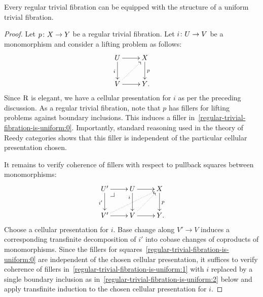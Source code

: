 \documentclass[reqno,10pt,a4paper,oneside,draft]{amsart}
\begin{document}
\begin{proposition} \label{regular-trivial-fibration-to-uniform}
Every regular trivial fibration can be equipped with the structure of a uniform trivial fibration.
\end{proposition}

\begin{proof} Let $p \colon X \to Y$ be a regular trivial fibration.
Let $i \colon U \to V$ be a monomorphism and consider a lifting problem as follows:
\begin{equation} \label{regular-trivial-fibration-is-uniform:0}
\xycenter{
  U
  \ar[d]_{i}
  \ar[r]
&
  X
  \ar[d]^{p}
\\
  V
  \ar[r]
  \ar@{.>}[ur]
&
  Y
\rlap{.}}
\end{equation}
Since $\mathrm{R}$ is elegant, we have a cellular presentation for $i$ as per the preceding discussion.
As a regular trivial fibration, note that $p$ has fillers for lifting problems against boundary inclusions.
This induces a filler in~\eqref{regular-trivial-fibration-is-uniform:0}.
Importantly, standard reasoning used in the theory of Reedy categories shows that this filler is independent of the particular cellular presentation chosen.

It remains to verify coherence of fillers with respect to pullback squares between monomorphisms:
\begin{equation} \label{regular-trivial-fibration-is-uniform:1}
\xycenter{
  U'
  \ar[d]_{i'}
  \ar[r]
  \pullback{dr}
&
  U
  \ar[d]_(0.3){i}
  \ar[r]
&
  X
  \ar[d]^{p}
\\
  V'
  \ar[r]
  \ar@{.>}[urr]
&
  V
  \ar[r]
  \ar@{.>}[ur]
&
  Y
\rlap{.}}
\end{equation}
Choose a cellular presentation for $i$.
Base change along $V' \to V$ induces a corresponding transfinite decomposition of $i'$ into cobase changes of coproducts of monomorphisms.
Since the fillers for squares~\eqref{regular-trivial-fibration-is-uniform:0} are independent of the chosen cellular presentation, it suffices to verify coherence of fillers in~\eqref{regular-trivial-fibration-is-uniform:1} with $i$ replaced by a single boundary inclusion as in~\eqref{regular-trivial-fibration-is-uniform:2} below and apply transfinite induction to the chosen cellular presentation for $i$.


\end{proof}
\end{document}
